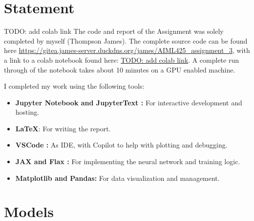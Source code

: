 \documentclass[conference,a4paper]{IEEEtran}
\begin{document}
\newpage
\section*{Statement}

TODO: add colab link
The code and report of the Assignment was solely completed by myself (Thompson James). The complete source code can be found here \url{https://gitea.james-server.duckdns.org/james/AIML425\_assignment\_3}, with a link to a colab notebook found here: \url{TODO: add colab link}. A complete run through of the notebook takes about 10 minutes on a GPU enabled machine.

I completed my work using the following tools:
\begin{itemize}
    \item \textbf{Jupyter Notebook \cite{Kluyver2016jupyter} and JupyterText \cite{woutsMwoutsJupytext2025}:} For interactive development and hosting.
    \item \textbf{\LaTeX}: For writing the report.
    \item \textbf{VSCode \cite{MicrosoftVscode2025}:} As IDE, with Copilot to help with plotting and debugging.
    \item \textbf{JAX \cite{jax2018github} and Flax \cite{flax2020github}:} For implementing the neural network and training logic.
    \item \textbf{Matplotlib\cite{Hunter:2007} and Pandas\cite{thepandasdevelopmentteamPandasdevPandasPandas}:} For data visualization and management.
\end{itemize}





\appendix

\section{Models}
\end{document}
